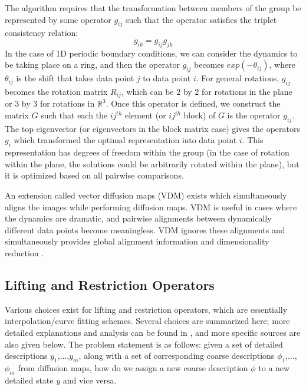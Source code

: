 \documentclass[12pt]{article}
\begin{document}
The algorithm requires that the transformation between members of the group be represented by some operator $g_{ij}$ such that the operator satisfies the triplet consistency relation:
\[
g_{ik} = g_{ij}g_{jk}
\]
In the case of 1D periodic boundary conditions, we can consider the dynamics to be taking place on a ring, and then the operator $g_{ij}$ becomes $exp(-\theta_{ij})$, where $\theta_{ij}$ is the shift that takes data point $j$ to data point $i$. For general rotations, $g_{ij}$ becomes the rotation matrix $R_{ij}$, which can be $2$ by $2$ for rotations in the plane or $3$ by $3$ for rotations in $\mathbb{R}^3$. Once this operator is defined, we construct the matrix $G$ such that each the $ij^{th}$ element (or $ij^{th}$  block) of $G$ is the operator $g_{ij}$. The top eigenvector (or eigenvectors in the block matrix case) gives the operators $g_i$ which transformed the optimal representation into data point $i$. This representation has degrees of freedom within the group (in the case of rotation within the plane, the solutions could be arbitrarily rotated within the plane), but it is optimized based on all pairwise comparisons. \vspace{1mm}

An extension called vector diffusion maps (VDM) exists which simultaneously aligns the images while performing diffusion maps. VDM is useful in cases where the dynamics are dramatic, and pairwise alignments between dynamically different data points become meaningless. VDM ignores these alignments and simultaneously provides global alignment information and dimensionality reduction \cite{Sonday2013, Dsilva}.

\subsection{Lifting and Restriction Operators} \label{DMLR}

Various choices exist for lifting and restriction operators, which are essentially interpolation/curve fitting schemes. Several choices are summarized here; more detailed explanations and analysis can be found in \cite{Chiavazzo2014}, and more specific sources are also given below. The problem statement is as follows: given a set of detailed descriptions $y_1$,...,$y_\textit{m}$, along with a set of corresponding coarse descriptions $\phi_1$,...,$\phi_\textit{m}$ from diffusion maps, how do we assign a new coarse description $\phi$ to a new detailed state $y$ and vice versa.
\end{document}
